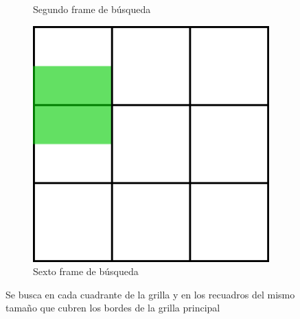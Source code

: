 \begin{figure}
\begin{subfigure}[b]{0.25\textwidth}
		\caption{Segundo frame de búsqueda}
		\label{frames_solapados_2}
	\end{subfigure}	
	\quad
	\begin{subfigure}[b]{0.25\textwidth}
		\includegraphics[width=\textwidth]{img/sextocuadrante.png}
		\caption{Sexto frame de búsqueda}
		\label{frames_solapados_3}
	\end{subfigure}
	\caption{Se busca en cada cuadrante de la grilla y en los recuadros del mismo tamaño que cubren los bordes de la grilla principal}
	\label{frames_solapados}
\end{figure}

